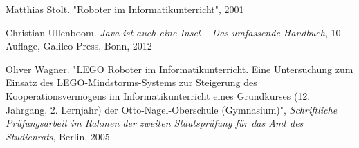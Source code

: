 \begin{thebibliography}{ABCDEF}
Matthias Stolt. "Roboter im Informatikunterricht", 2001

Christian Ullenboom. \emph{Java ist auch eine Insel -- Das umfassende Handbuch}, 10. Auflage, Galileo Press, Bonn, 2012

Oliver Wagner. "LEGO Roboter im Informatikunterricht. Eine Untersuchung zum Einsatz des LEGO-Mindstorms-Systems zur Steigerung des Kooperationsvermögens im Informatikunterricht eines Grundkurses (12. Jahrgang, 2. Lernjahr) der Otto-Nagel-Oberschule (Gymnasium)", \emph{Schriftliche Prüfungsarbeit im Rahmen der zweiten Staatsprüfung für das Amt des Studienrats}, Berlin, 2005

\end{thebibliography}
